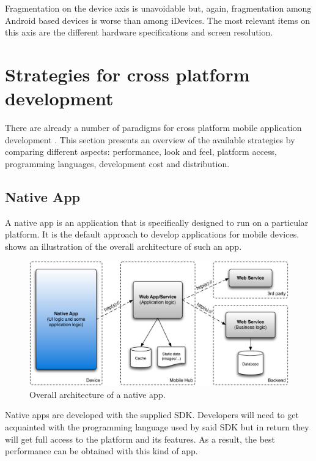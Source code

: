 \npar Fragmentation on the device axis is unavoidable but, again, fragmentation among Android based devices is worse than among iDevices. The most relevant items on this axis are the different hardware specifications and screen resolution.

\npar 

\section{Strategies for cross platform development}

\npar There are already a number of paradigms for cross platform mobile application development \citep{Friese}. This section presents an overview of the available strategies by comparing different aspects: performance, look and feel, platform access, programming languages, development cost and distribution.

\subsection{Native App}

\npar A native app is an application that is specifically designed to run on a particular platform. It is the default approach to develop applications for mobile devices.  shows an illustration of the overall architecture of such an app. 

\begin{figure}[h!]
    \begin{center}
        \includegraphics[width=\textwidth]{figs/native.pdf}
        \caption{
            Overall architecture of a native app. 
        }
        \label{fig:native}
    \end{center}
\end{figure}

\npar Native apps are developed with the supplied SDK. Developers will need to get acquainted with the programming language used by said SDK but in return they will get full access to the platform and its features. As a result, the best performance can be obtained with this kind of app.


